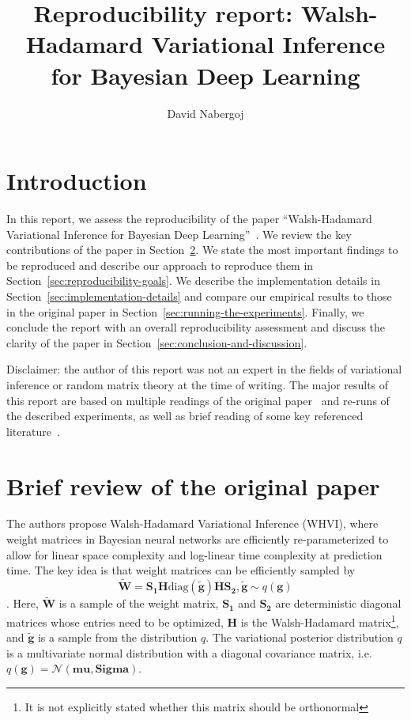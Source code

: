 \documentclass[11pt]{article}
\author{David Nabergoj}
\title{Reproducibility report: Walsh-Hadamard Variational Inference for Bayesian Deep Learning}
\begin{document}
    \maketitle


    \section{Introduction}\label{sec:introduction}
    In this report, we assess the reproducibility of the paper ``Walsh-Hadamard Variational Inference for Bayesian Deep Learning''~\cite{rossi2019walsh}.
    We review the key contributions of the paper in Section~\ref{sec:brief-review-of-the-paper}.
    We state the most important findings to be reproduced and describe our approach to reproduce them in Section~\ref{sec:reproducibility-goals}.
    We describe the implementation details in Section~\ref{sec:implementation-details} and compare our empirical results to those in the original paper in Section~\ref{sec:running-the-experiments}.
    Finally, we conclude the report with an overall reproducibility assessment and discuss the clarity of the paper in Section~\ref{sec:conclusion-and-discussion}.

    Disclaimer: the author of this report was not an expert in the fields of variational inference or random matrix theory at the time of writing.
    The major results of this report are based on multiple readings of the original paper~\cite{rossi2019walsh} and re-runs of the described experiments, as well as brief reading of some key referenced literature~\cite{le2014fastfood, blundell2015weight, fino1976unified, kingma2015variational}.

    \section{Brief review of the original paper}\label{sec:brief-review-of-the-paper}
    The authors propose Walsh-Hadamard Variational Inference (WHVI), where weight matrices in Bayesian neural networks are efficiently re-parameterized to allow for linear space complexity and log-linear time complexity at prediction time.
    The key idea is that weight matrices can be efficiently sampled by
    $$
    \widetilde{\mathbf{W}} = \mathbf{S_1} \mathbf{H} \mathrm{diag}(\widetilde{\mathbf{g}}) \mathbf{H} \mathbf{S_2}, \widetilde{\mathbf{g}} \sim q(\mathbf{g})
    $$.
    Here, $\widetilde{\mathbf{W}}$ is a sample of the weight matrix, $\mathbf{S_1}$ and $\mathbf{S_2}$ are deterministic diagonal matrices whose entries need to be optimized, $\mathbf{H}$ is the Walsh-Hadamard matrix\footnote{It is not explicitly stated whether this matrix should be orthonormal}, and $\widetilde{\mathbf{g}}$ is a sample from the distribution $q$.
    The variational posterior distribution $q$ is a multivariate normal distribution with a diagonal covariance matrix, i.e.\ $q(\mathbf{g}) = \mathcal{N}(\mathbf{mu}, \mathbf{Sigma})$.
\end{document}

